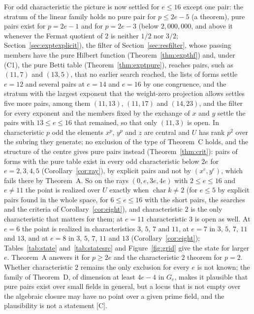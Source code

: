 \documentclass[11pt]{article}
\theoremstyle{definition}
\theoremstyle{remark}
\newcommand{\ch}{\operatorname{char}}
\begin{document}
For odd characteristic the picture is now settled for $e\le16$ except one pair: the stratum of the linear family holds no pure pair for $p\le2e-5$ (a theorem), pure pairs exist for $p=2e-1$ and for $p=2e-3$ (below $2{,}000{,}000$, and above it whenever the Fermat quotient of $2$ is neither $1/2$ nor $3/2$; Section~\ref{sec:exptexplicit}), the filter of Section~\ref{sec:resfilter}, whose passing members have the pure Hilbert function (Theorem~\ref{thm:expthf}) and, under (C1), the pure Betti table (Theorem~\ref{thm:exptpure}), reaches pairs, such as $(11,7)$ and $(13,5)$, that no earlier search reached, the lists of forms settle $e=12$ and several pairs at $e=14$ and $e=16$ by one congruence, and the stratum with the largest exponent that the weight-zero projection allows settles five more pairs, among them $(11,13)$, $(11,17)$ and $(14,23)$, and the filter for every exponent and the members fixed by the exchange of $x$ and $y$ settle the pairs with $13\le e\le16$ that remained, so that only $(11,3)$ is open. In characteristic $p$ odd the elements $x^p$, $y^p$ and $z$ are central and $U$ has rank $p^2$ over the subring they generate; no exclusion of the type of Theorem~C holds, and the structure of the centre gives pure pairs instead (Theorem~\ref{thm:crit}): pairs of forms with the pure table exist in every odd characteristic below $2e$ for $e=2,3,4,5$ (Corollary~\ref{cor:ray}), by explicit pairs and not by $(x^e,y^e)$, which fails there by Theorem~A. So on the rays $(0,e,3e,4e)$ with $2\le e\le16$ and $e\ne11$ the point is realized over $U$ exactly when $\ch k\ne2$ (for $e\le5$ by explicit pairs found in the whole space, for $6\le e\le16$ with the short pairs, the searches and the criteria of Corollary~\ref{cor:eight}), and characteristic $2$ is the only characteristic that matters for them; at $e=11$ characteristic $3$ is open as well. At $e=6$ the point is realized in characteristics $3$, $5$, $7$ and $11$, at $e=7$ in $3$, $5$, $7$, $11$ and $13$, and at $e=8$ in $3$, $5$, $7$, $11$ and $13$ (Corollary~\ref{cor:eight}); Tables~\ref{tab:state} and~\ref{tab:statesrc} and Figure~\ref{fig:grid} give the state for larger $e$. Theorem~A answers it for $p\ge2e$ and the characteristic $2$ theorem for $p=2$. Whether characteristic $2$ remains the only exclusion for every $e$ is not known; the family of Theorem~D, of dimension at least $4e-4$ in $G_e$, makes it plausible that pure pairs exist over small fields in general, but a locus that is not empty over the algebraic closure may have no point over a given prime field, and the plausibility is not a statement [C].
\end{document}
